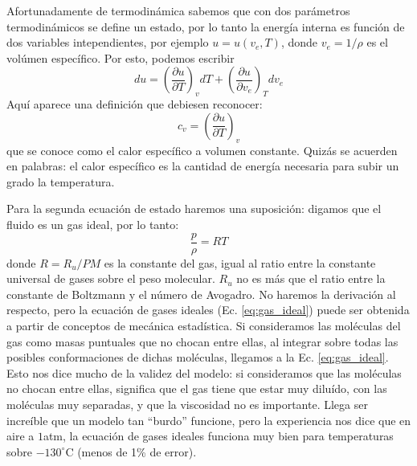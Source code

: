 Afortunadamente de termodinámica sabemos que con dos parámetros termodinámicos se define un estado, por lo tanto la energía interna es función de dos variables intependientes, por ejemplo $u=u(v_e,T)$, donde $v_e=1/\rho$ es el volúmen específico.
Por esto, podemos escribir
%
\begin{equation}\label{eq:denergia_interna}
du = \left(\frac{\partial u}{\partial T}\right)_vdT + \left(\frac{\partial u}{\partial v_e}\right)_Tdv_e
\end{equation}
%
Aquí aparece una definición que debiesen reconocer:
%
\begin{equation}
c_v = \left(\frac{\partial u}{\partial T}\right)_v
\end{equation}
%
que se conoce como el calor específico a volumen constante.
Quizás se acuerden en palabras: el calor específico es la cantidad de energía necesaria para subir un grado la temperatura.

Para la segunda ecuación de estado haremos una suposición: digamos que el fluido es un gas ideal, por lo tanto:
%
\begin{equation}\label{eq:gas_ideal}
\frac{p}{\rho} = RT
\end{equation}
%
donde $R=R_u/PM$ es la constante del gas, igual al ratio entre la constante  universal de gases sobre el peso molecular.
$R_u$ no es más que el ratio entre la constante de Boltzmann y el número de Avogadro.
No haremos la derivación al respecto, pero la ecuación de gases ideales (Ec. \eqref{eq:gas_ideal}) puede ser obtenida a partir de conceptos de mecánica estadística. 
Si consideramos las moléculas del gas como masas puntuales que no chocan entre ellas, al integrar sobre todas las posibles conformaciones de dichas moléculas, llegamos a la Ec. \eqref{eq:gas_ideal}.
Esto nos dice mucho de la validez del modelo: si consideramos que las moléculas no chocan entre ellas, significa que el gas tiene que estar muy diluído, con las moléculas muy separadas, y que la viscosidad no es importante.
Llega ser increíble que un modelo tan ``burdo'' funcione, pero la experiencia nos dice que en aire a $1$atm, la ecuación de gases ideales funciona muy bien para temperaturas sobre $-130^\circ$C (menos de 1\% de error).

